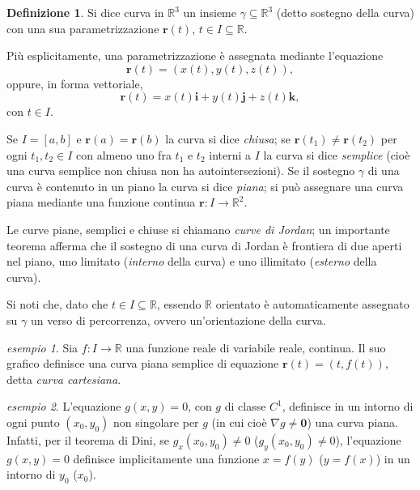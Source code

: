 \documentclass[a4paper]{book}
\numberwithin{equation}{section}
\theoremstyle{plain}
\theoremstyle{definition}
\newtheorem{defn}{Definizione}[section]
\theoremstyle{remark}
\renewcommand{\vec}{\boldsymbol}
\theoremstyle{example}
\newtheorem{exmp}{esempio}[section]
\begin{document}
\begin{defn}
	Si dice curva in $\mathbb{R}^3$ un insieme $\gamma \subseteq \mathbb{R}^3$ (detto sostegno della curva) con una sua parametrizzazione $\vec{r}(t)$, $t \in I \subseteq \mathbb{R}$.
\end{defn}

Più esplicitamente, una parametrizzazione è assegnata mediante l'equazione
\begin{equation*}
	\vec{r}(t) = (x(t), y(t), z(t)),
\end{equation*}
oppure, in forma vettoriale,
\begin{equation*}
	\vec{r}(t) = x(t)\vec{i} + y(t)\vec{j} + z(t)\vec{k},
\end{equation*}
con $t \in I$.

Se $I = [a, b]$ e $\vec{r}(a) = \vec{r}(b)$ la curva si dice \emph{chiusa}; se $\vec{r}(t_1) \ne \vec{r}(t_2)$ per ogni $t_1, t_2 \in I$ con almeno uno fra $t_1$ e $t_2$ interni a $I$ la curva si dice \emph{semplice} (cioè una curva semplice non chiusa non ha autointersezioni). Se il sostegno $\gamma$ di una curva è contenuto in un piano la curva si dice \emph{piana}; si può assegnare una curva piana mediante una funzione continua $\vec{r} \colon \! I \to \mathbb{R}^2$.

Le curve piane, semplici e chiuse si chiamano \emph{curve di Jordan}; un importante teorema afferma che il sostegno di una curva di Jordan è frontiera di due aperti nel piano, uno limitato (\emph{interno} della curva) e uno illimitato (\emph{esterno} della curva).

Si noti che, dato che $t \in I \subseteq \mathbb{R}$, essendo $\mathbb{R}$ orientato è automaticamente assegnato su $\gamma$ un verso di percorrenza, ovvero un'orientazione della curva.

\begin{exmp}
	Sia $f \colon I \to \mathbb{R}$ una funzione reale di variabile reale, continua. Il suo grafico definisce una curva piana semplice di equazione $\vec{r}(t) = (t, f(t))$, detta \emph{curva cartesiana}.
\end{exmp}

\begin{exmp}
	L'equazione $g(x, y) = 0$, con $g$ di classe $C^1$, definisce in un intorno di ogni punto $(x_0, y_0)$ non singolare per $g$ (in cui cioè $\nabla g \ne \vec{0}$) una curva piana. Infatti, per il teorema di Dini, se $g_x(x_0, y_0) \ne 0$ ($g_y(x_0, y_0) \ne 0$), l'equazione $g(x, y) = 0$ definisce implicitamente una funzione $x = f(y)$ ($y = f(x)$) in un intorno di $y_0$ ($x_0$).
\end{exmp}
\end{document}
